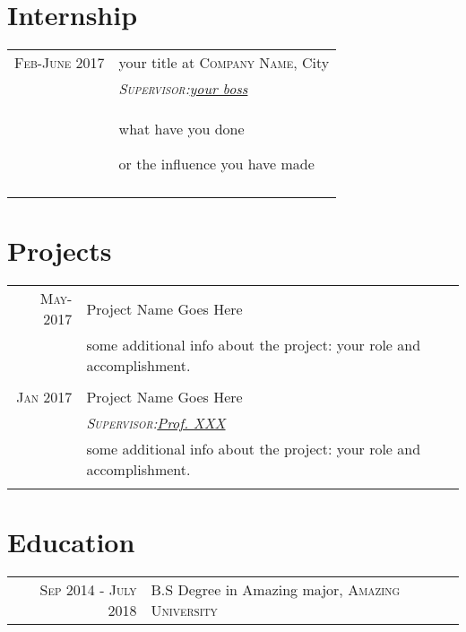 \documentclass[a4paper,10pt]{article}
\begin{document}
\section{Internship}
\begin{tabular}{r|p{11cm}}
 \textsc{Feb-June 2017} & your title at \textsc{Company Name}, City \\&\emph{\textsc{Supervisor:}\hspace{0.2cm}\href{mailto:your.boss@company.com}{your boss}}\\&
\begin{itemize}
  \footnotesize{
  \item what have you done
  \item or the influence you have made}
\end{itemize}
\\\multicolumn{2}{c}{} \\
\end{tabular}

\section{Projects}
\begin{tabular}{r|p{11cm}}
 \textsc{May- 2017} & Project Name Goes Here \\&
  \footnotesize{some additional info about the project: your role and accomplishment.}
\\\multicolumn{2}{c}{} \\
 \textsc{Jan 2017} & Project Name Goes Here\\&
 \emph{\textsc{Supervisor:}\hspace{0.2cm}\href{mailto:supervisor@example.edu.cn}{Prof. XXX}}\\&
  \footnotesize{some additional info about the project: your role and accomplishment.}
\\\multicolumn{2}{c}{} \\
\end{tabular}

\section{Education}
\begin{tabular}{rl}
 \textsc{Sep} 2014 - \textsc{July} 2018 & B.S Degree in Amazing major, \textsc{Amazing University}\\
\end{tabular}
\end{document}
